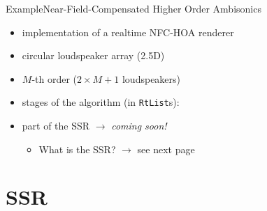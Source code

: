 \documentclass{beamer}
\begin{document}
\begin{frame}{Example}{Near-Field-Compensated Higher Order Ambisonics}
\begin{itemize}
\item implementation of a realtime NFC-HOA renderer
\item circular loudspeaker array (2.5D)
\item $M$-th order ($2\times M + 1$ loudspeakers)
\pause
\item stages of the algorithm (in \texttt{RtList}s):
\pause
\item part of the SSR {\color{TUBblue}$\to$ \emph{coming soon!}}
\begin{itemize}
\item What is the SSR? {\color{TUBblue}$\to$ see next page}
\end{itemize}
\end{itemize}
\end{frame}

\section{SSR}
\end{document}
